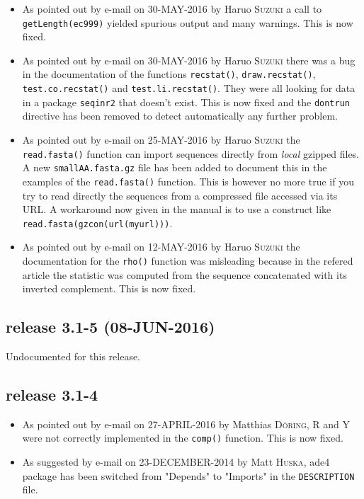 \documentclass{article}
\begin{document}
\begin{itemize}

\item As pointed out by e-mail on 30-MAY-2016 by Haruo \textsc{Suzuki} a
call to \texttt{getLength(ec999)} yielded spurious output and
many warnings. This is now fixed.

\item As pointed out by e-mail on 30-MAY-2016 by Haruo \textsc{Suzuki} there
was a bug in the documentation of the functions \texttt{recstat()},
\texttt{draw.recstat()}, \texttt{test.co.recstat()} and
\texttt{test.li.recstat()}. They were all looking for data in
a package \texttt{seqinr2} that doesn't exist. This is now
fixed and the \texttt{dontrun} directive has been removed to
detect automatically any further problem.

\item As pointed out by e-mail on 25-MAY-2016 by Haruo \textsc{Suzuki} the
\texttt{read.fasta()} function can import sequences directly from
\textit{local} gzipped files. A new \texttt{smallAA.fasta.gz} file
has been added to document this in the examples of the
\texttt{read.fasta()} function. This is however no more true if
you try to read directly the sequences from a compressed file
accessed via its URL. A workaround now given in the manual
is to use a construct like \texttt{read.fasta(gzcon(url(myurl)))}.

\item As pointed out by e-mail on 12-MAY-2016 by Haruo \textsc{Suzuki} the
documentation for the \texttt{rho()} function was misleading
because in the refered article \cite{KarlinS1994} the statistic
was computed from the sequence concatenated with its inverted complement.
This is now fixed.

\end{itemize}

\subsection*{release 3.1-5 (08-JUN-2016)}

Undocumented for this release.

\subsection*{release 3.1-4}

\begin{itemize}

\item As pointed out by e-mail on 27-APRIL-2016 by Matthias \textsc{D\"oring}, R and Y were not correctly implemented in the  \texttt{comp()} function. This is now fixed.


\item As suggested by e-mail on 23-DECEMBER-2014 by Matt \textsc{Huska}, ade4 package has been switched from "Depends" to "Imports" in the \texttt{DESCRIPTION} file.


\end{itemize}
\end{document}
